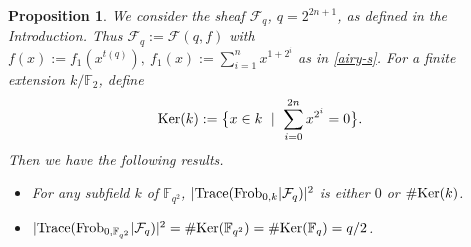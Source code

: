 \documentclass[11pt]{amsart}
\theoremstyle{plain}
\newtheorem{prop}[thm]{Proposition}
\theoremstyle{definition}
\numberwithin{thm}{section}
\numberwithin{equation}{thm}
\newcommand{\Trace}{{\rm Trace}}
\newcommand{\Ker}{{\rm Ker}}
\newcommand{\sF}{{\mathcal F}}
\newcommand{\F}{{\mathbb F}}
\newcommand{\0}{\emptyset}
\newcommand{\Frob}{\mathrm{Frob}}
\begin{document}
\begin{prop}\label{traces-f0a}
We consider the sheaf $\sF_q$, $q=2^{2n+1}$, as defined in the Introduction. Thus $\sF_q:=\sF(q,f)$ with $f(x):=f_1(x^{t(q)}), \ f_1(x):=\sum_{i=1}^n x^{1+2^i}$ as in 
\eqref{airy-s}. For a finite extension $k/\F_2$, define
$$\Ker(k):=\bigl{\{}x \in k\  \mid\  \sum_{i=0}^{2n}x^{2^i} =0\bigr{\}}.$$
Then we have the following results.
\begin{itemize}
\item[(i)]For any subfield $k$ of $\F_{q^2}$, $|\Trace(\Frob_{0,k}|\sF_q)|^2$ is either $0$ or $\#\Ker(k)$. 
\item[(ii)]$|\Trace(\Frob_{0,\F_{q^2}}|\sF_q)|^2=\#\Ker(\F_{q^2})=\#\Ker(\F_q)=q/2$.
\end{itemize}
\end{prop}
\end{document}
